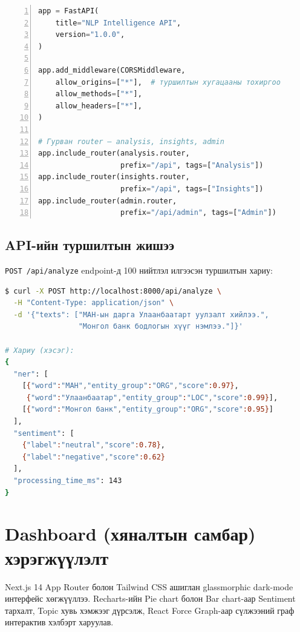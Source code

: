 \begin{lstlisting}[language=Python, caption={FastAPI adapter — main.py роутер бүртгэлт}, basicstyle=\small\ttfamily, breaklines=true, frame=single, numbers=left]
app = FastAPI(
    title="NLP Intelligence API",
    version="1.0.0",
)

app.add_middleware(CORSMiddleware,
    allow_origins=["*"],  # туршилтын хугацааны тохиргоо
    allow_methods=["*"],
    allow_headers=["*"],
)

# Гурван router — analysis, insights, admin
app.include_router(analysis.router,
                   prefix="/api", tags=["Analysis"])
app.include_router(insights.router,
                   prefix="/api", tags=["Insights"])
app.include_router(admin.router,
                   prefix="/api/admin", tags=["Admin"])
\end{lstlisting}

\subsection{API-ийн туршилтын жишээ}

\texttt{POST /api/analyze} endpoint-д 100 нийтлэл илгээсэн туршилтын хариу:

\begin{lstlisting}[language=bash, caption={curl ашиглан API туршилт}, basicstyle=\small\ttfamily, breaklines=true, frame=single]
$ curl -X POST http://localhost:8000/api/analyze \
  -H "Content-Type: application/json" \
  -d '{"texts": ["МАН-ын дарга Улаанбаатарт уулзалт хийлээ.",
                 "Монгол банк бодлогын хүүг нэмлээ."]}'

# Хариу (хэсэг):
{
  "ner": [
    [{"word":"МАН","entity_group":"ORG","score":0.97},
     {"word":"Улаанбаатар","entity_group":"LOC","score":0.99}],
    [{"word":"Монгол банк","entity_group":"ORG","score":0.95}]
  ],
  "sentiment": [
    {"label":"neutral","score":0.78},
    {"label":"negative","score":0.62}
  ],
  "processing_time_ms": 143
}
\end{lstlisting}

\section{Dashboard (хяналтын самбар) хэрэгжүүлэлт}

Next.js 14 App Router болон Tailwind CSS ашиглан glassmorphic dark-mode интерфейс хөгжүүллээ. Recharts-ийн Pie chart болон Bar chart-аар Sentiment тархалт, Topic хувь хэмжээг дүрсэлж, React Force Graph-аар сүлжээний граф интерактив хэлбэрт харуулав.


